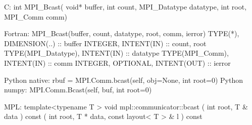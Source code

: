 C:
int MPI_Bcast(
    void* buffer, int count, MPI_Datatype datatype,
    int root, MPI_Comm comm)

Fortran:
MPI_Bcast(buffer, count, datatype, root, comm, ierror)
TYPE(*), DIMENSION(..) :: buffer
INTEGER, INTENT(IN) :: count, root
TYPE(MPI_Datatype), INTENT(IN) :: datatype
TYPE(MPI_Comm), INTENT(IN) :: comm
INTEGER, OPTIONAL, INTENT(OUT) :: ierror

Python native:
rbuf = MPI.Comm.bcast(self, obj=None, int root=0)
Python numpy:
MPI.Comm.Bcast(self, buf, int root=0)

MPL:
template<typename T >
void mpl::communicator::bcast
   ( int  root, T &  data ) const
   ( int  root, T *  data, const layout< T > &  l ) const
